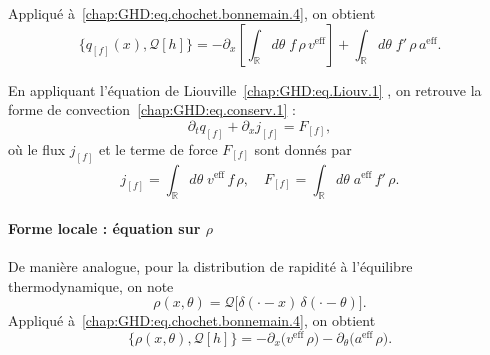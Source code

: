 Appliqué à~\eqref{chap:GHD:eq.chochet.bonnemain.4}, on obtient
\begin{equation}\label{chap:GHD:eq.chochet.bonnemain.5}
	\{q_{[f]}(x), \mathcal{Q}[h]\} 
	= - \partial_x \left[ \int_{\mathbb{R}} d\theta \; f \, \rho \, v^{\mathrm{eff}} \right]
	+ \int_{\mathbb{R}} d\theta \; f' \, \rho \, a^{\mathrm{eff}}.
\end{equation}

En appliquant l’équation de Liouville~\eqref{chap:GHD:eq.Liouv.1} , on retrouve la forme de convection~\eqref{chap:GHD:eq.conserv.1} :
\begin{equation}\label{chap:GHD:eq.conserv.2}
	\partial_t q_{[f]} + \partial_x j_{[f]} = F_{[f]},
\end{equation}
où le flux $j_{[f]}$ et le terme de force $F_{[f]}$ sont donnés par
\begin{equation}\label{chap:GHD:eq.conserv.2.1}
	j_{[f]} = \int_{\mathbb{R}} d\theta \; v^{\mathrm{eff}} \, f \, \rho,
	\quad F_{[f]} = \int_{\mathbb{R}} d\theta \; a^{\mathrm{eff}} \, f' \, \rho.
\end{equation}

\paragraph{Forme locale : équation sur \texorpdfstring{$\rho$}{rho}} 
De manière analogue, pour la distribution de rapidité à l’équilibre thermodynamique, on note
\begin{equation}
	\rho(x,\theta) = \mathcal{Q}\big[ \delta(\cdot - x) \, \delta(\cdot - \theta) \big].
\end{equation}
Appliqué à~\eqref{chap:GHD:eq.chochet.bonnemain.4}, on obtient
\begin{equation}\label{chap:GHD:eq.chochet.bonnemain.6}
	\{\rho(x,\theta), \mathcal{Q}[h]\} 
	= - \partial_x \big( v^{\mathrm{eff}} \, \rho \big)
	  - \partial_\theta \big( a^{\mathrm{eff}} \, \rho \big).
\end{equation}


